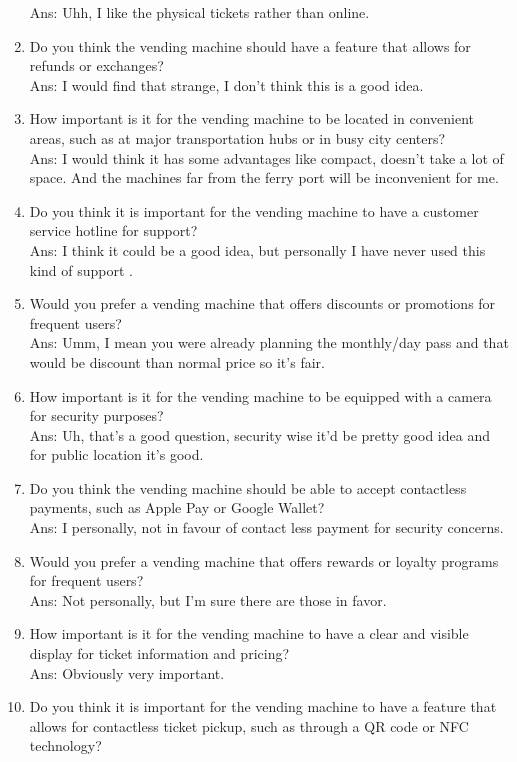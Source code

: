 \begin{enumerate}
Ans: Uhh, I like the physical tickets rather than online.
    \item Do you think the vending machine should have a feature that allows for refunds or exchanges?\\
Ans: I would find that strange, I don't think this is a good idea.
    \item How important is it for the vending machine to be located in convenient areas, such as at major transportation hubs or in busy city centers?\\
Ans: I would think it has some advantages like compact, doesn’t take a lot of space. And the machines far from the ferry port will be inconvenient for me.
    \item Do you think it is important for the vending machine to have a customer service hotline for support?\\
Ans: I think it could be a good idea, but personally I have never used this kind of support .
    \item Would you prefer a vending machine that offers discounts or promotions for frequent users?\\
Ans: Umm, I mean you were already planning the monthly/day pass and that would be discount than normal price so it's fair.
    \item How important is it for the vending machine to be equipped with a camera for security purposes?\\
Ans: Uh, that’s a good question, security wise it’d be pretty good idea and for public location it's good.
    \item Do you think the vending machine should be able to accept contactless payments, such as Apple Pay or Google Wallet?\\
Ans: I personally, not in favour of contact less payment for security concerns.
    \item Would you prefer a vending machine that offers rewards or loyalty programs for frequent users?\\
Ans: Not personally, but I'm sure there are those in favor.
    \item How important is it for the vending machine to have a clear and visible display for ticket information and pricing?\\
Ans: Obviously very important.
    \item Do you think it is important for the vending machine to have a feature that allows for contactless ticket pickup, such as through a QR code or NFC technology?\\

\end{enumerate}
